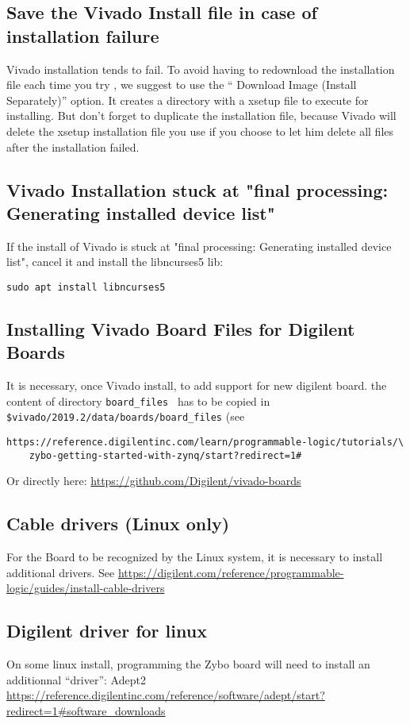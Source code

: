 \subsection{Save the Vivado Install file in case of installation failure}
\label{installSave}

Vivado installation tends to fail. To avoid having to redownload the installation file each time you try , we suggest to use the “ Download Image (Install Separately)” option. It creates a directory with a xsetup file to execute for installing. But don't forget to duplicate the installation file, because Vivado will delete the xsetup installation file you use if you choose to let him delete all files after the installation failed.
\subsection{Vivado Installation stuck at "final processing: Generating installed device list"}
If the install of Vivado is stuck at "final processing: Generating installed device list", cancel it and install the libncurses5 lib:
\begin{verbatim}
sudo apt install libncurses5
\end{verbatim}

\subsection{Installing Vivado Board Files for Digilent Boards}
\label{boardfiles}
It is necessary, once Vivado install, to add support for new digilent board.
the content of directory {\tt board\_files } has to be copied in \verb#$vivado/2019.2/data/boards/board_files#
(see \begin{verbatim}https://reference.digilentinc.com/learn/programmable-logic/tutorials/\ 
    zybo-getting-started-with-zynq/start?redirect=1#
\end{verbatim}

Or directly here: \url{https://github.com/Digilent/vivado-boards}

\subsection{Cable drivers (Linux only)}
For the Board to be recognized by the Linux system, it is necessary to install additional drivers. See \url{https://digilent.com/reference/programmable-logic/guides/install-cable-drivers}


\subsection{Digilent driver for linux}
On some linux install, programming the Zybo board will need to install an additionnal ``driver'': Adept2 \url{https://reference.digilentinc.com/reference/software/adept/start?redirect=1#software_downloads}

